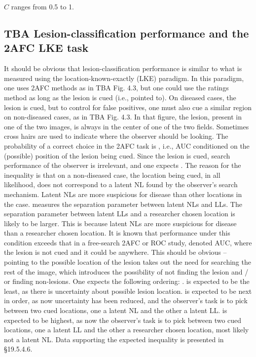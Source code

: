 \documentclass[
]{book}
\begin{document}
\(C\) ranges from 0.5 to 1.

\hypertarget{rsm-sc-search-classification-2afc-lke}{%
\subsection{TBA Lesion-classification performance and the 2AFC LKE task}\label{rsm-sc-search-classification-2afc-lke}}

It should be obvious that lesion-classification performance is similar to what is measured using the location-known-exactly (LKE) paradigm. In this paradigm, one uses 2AFC methods as in TBA Fig. 4.3, but one could use the ratings method as long as the lesion is cued (i.e., pointed to). On diseased cases, the lesion is cued, but to control for false positives, one must also cue a similar region on non-diseased cases, as in TBA Fig. 4.3. In that figure, the lesion, present in one of the two images, is always in the center of one of the two fields. Sometimes cross hairs are used to indicate where the observer should be looking. The probability of a correct choice in the 2AFC task is , i.e., AUC conditioned on the (possible) position of the lesion being cued. Since the lesion is cued, search performance of the observer is irrelevant, and one expects . The reason for the inequality is that on a non-diseased case, the location being cued, in all likelihood, does not correspond to a latent NL found by the observer's search mechanism. Latent NLs are more suspicious for disease than other locations in the case. measures the separation parameter between latent NLs and LLs. The separation parameter between latent LLs and a researcher chosen location is likely to be larger. This is because latent NLs are more suspicious for disease than a researcher chosen location. It is known that performance under this condition exceeds that in a free-search 2AFC or ROC study, denoted AUC, where the lesion is not cued and it could be anywhere. This should be obvious -- pointing to the possible location of the lesion takes out the need for searching the rest of the image, which introduces the possibility of not finding the lesion and / or finding non-lesions. One expects the following ordering: . is expected to be the least, as there is uncertainty about possible lesion location. is expected to be next in order, as now uncertainty has been reduced, and the observer's task is to pick between two cued locations, one a latent NL and the other a latent LL. is expected to be highest, as now the observer's task is to pick between two cued locations, one a latent LL and the other a researcher chosen location, most likely not a latent NL. Data supporting the expected inequality is presented in §19.5.4.6.
\end{document}
